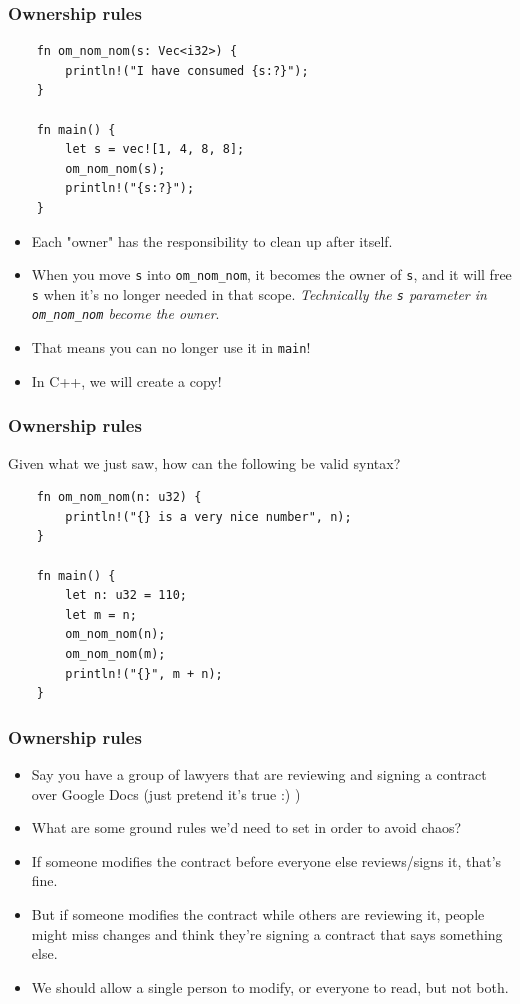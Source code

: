 \documentclass[aspectratio=1610,t]{beamer}
\begin{document}

\begin{frame}[fragile]
\frametitle{Ownership rules}
\begin{verbatim}
    fn om_nom_nom(s: Vec<i32>) {
        println!("I have consumed {s:?}");
    }

    fn main() {
        let s = vec![1, 4, 8, 8];
        om_nom_nom(s);
        println!("{s:?}");
    }
\end{verbatim}

\begin{itemize}
    \item Each "owner" has the responsibility to clean up after itself.
    \item When you move \texttt{s} into \texttt{om\_nom\_nom}, it becomes the owner of \texttt{s}, and it will free \texttt{s} when it’s no longer needed in that scope. \textit{Technically the \texttt{s} parameter in \texttt{om\_nom\_nom} become the owner}.
    \item That means you can no longer use it in \texttt{main}!
    \item In C++, we will create a copy!
\end{itemize}
\end{frame}


\begin{frame}[fragile]
\frametitle{Ownership rules}
Given what we just saw, how can the following be valid syntax?

\begin{verbatim}
    fn om_nom_nom(n: u32) {
        println!("{} is a very nice number", n);
    }

    fn main() {
        let n: u32 = 110;
        let m = n;
        om_nom_nom(n);
        om_nom_nom(m);
        println!("{}", m + n);
    }
\end{verbatim}
\end{frame}


\begin{frame}[fragile]
\frametitle{Ownership rules}
\begin{itemize}
    \item Say you have a group of lawyers that are reviewing and signing a contract over Google Docs (just pretend it's true :) )
    \item What are some ground rules we’d need to set in order to avoid chaos?
    \item If someone modifies the contract before everyone else reviews/signs it, that’s fine.
    \item But if someone modifies the contract while others are reviewing it, people might miss changes and think they’re signing a contract that says something else.
    \item We should allow a single person to modify, or everyone to read, but not both.
\end{itemize}
\end{frame}
\end{document}
